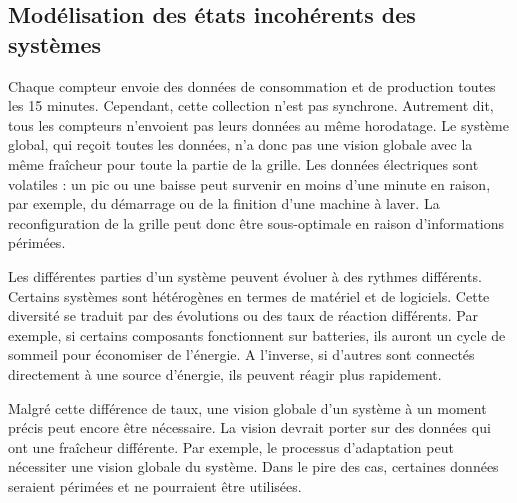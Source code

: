 \subsection{Modélisation des états incohérents des systèmes}
%
Chaque compteur envoie des données de consommation et de production toutes les 15 minutes. 
Cependant, cette collection n'est pas synchrone. 
Autrement dit, tous les compteurs n'envoient pas leurs données au même horodatage. 
Le système global, qui reçoit toutes les données, n'a donc pas une vision globale avec la même fraîcheur pour toute la partie de la grille. 
Les données électriques sont volatiles : un pic ou une baisse peut survenir en moins d'une minute en raison, par exemple, du démarrage ou de la finition d'une machine à laver. 
La reconfiguration de la grille peut donc être sous-optimale en raison d'informations périmées.

%
Les différentes parties d'un système peuvent évoluer à des rythmes différents. 
Certains systèmes sont hétérogènes en termes de matériel et de logiciels. 
Cette diversité se traduit par des évolutions ou des taux de réaction différents. 
Par exemple, si certains composants fonctionnent sur batteries, ils auront un cycle de sommeil pour économiser de l'énergie. 
A l'inverse, si d'autres sont connectés directement à une source d'énergie, ils peuvent réagir plus rapidement.

%
Malgré cette différence de taux, une vision globale d'un système à un moment précis peut encore être nécessaire. 
La vision devrait porter sur des données qui ont une fraîcheur différente. 
Par exemple, le processus d'adaptation peut nécessiter une vision globale du système. 
Dans le pire des cas, certaines données seraient périmées et ne pourraient être utilisées.

